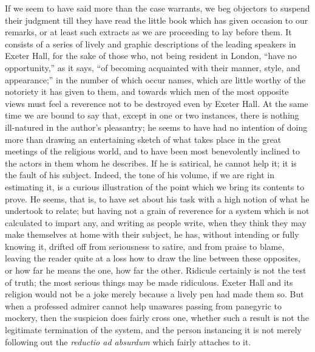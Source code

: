 If we seem
to have said more than the case warrants, we beg objectors to suspend
their judgment till they have read the little book which has given
occasion to our remarks, or at least such extracts as we are proceeding
to lay before them. It consists of a series of lively and graphic
descriptions of the leading speakers in Exeter Hall, for the sake of
those who, not being resident in London, ``have no opportunity,'' as
it says, ``of becoming acquainted with their manner, style, and
appearance;'' in the number of which occur names, which are little
worthy of the notoriety it has given to them, and towards which men of
the most opposite views must feel a reverence not to be destroyed even
by Exeter Hall. At the same time we are bound to say that, except in one
or two instances, there is nothing ill-natured in the author's
pleasantry; he seems to have had no intention of doing more than drawing
an entertaining sketch of what takes place in the great meetings of the
religious world, and to have been most benevolently inclined to the
actors in them whom he describes. If he is satirical, he cannot help it;
it is the fault of his subject. Indeed, the tone of his volume, if we
are right in estimating it, is a curious illustration of the point which
we bring its contents to prove. He seems, that is, to have set about his
task with a high notion of what he undertook to relate; but having not a
grain of reverence for a system which is not calculated to impart any,
and writing as people write, when they think they may make themselves
at home with their
subject, he has, without intending or fully knowing it, drifted off from
seriousness to satire, and from praise to blame, leaving the reader
quite at a loss how to draw the line between these opposites, or how far
he means the one, how far the other. Ridicule certainly is not the test
of truth; the most serious things may be made ridiculous. Exeter Hall
and its religion would not be a joke merely because a lively pen had
made them so. But when a professed admirer cannot help unawares passing
from panegyric to mockery, then the suspicion does fairly cross one,
whether such a result is not the legitimate termination of the system,
and the person instancing it is not merely following out the \emph{reductio
ad absurdum} which fairly attaches to it.

